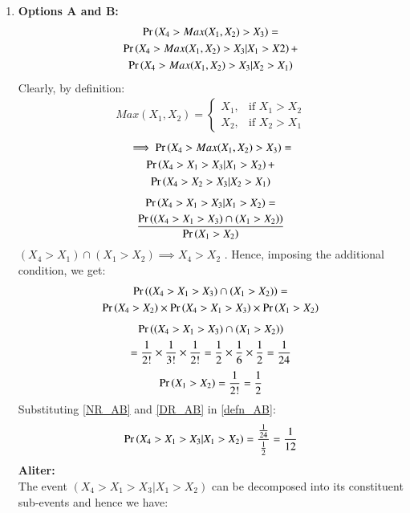 \documentclass[journal,12pt,twocolumn]{IEEEtran}
\begin{document}
\begin{enumerate}
    \item \textbf{Options A and B:}
\begin{multline}
    \Pr\left(X_4 > Max(X_1,X_2) > X_3\right) = \\\Pr\left(X_4 > Max(X_1,X_2) > X_3 | X_1>X2 \right) + \\ \Pr\left(X_4 > Max(X_1,X_2) > X_3 | X_2>X_1 \right)
\end{multline}
Clearly, by definition:
\begin{align}
  Max(X_1,X_2) = 
  \begin{cases}
      X_1, & \text{if } X_1>X_2\\
    X_2, & \text{if } X_2>X_1
  \end{cases}
\end{align}
\begin{multline}
    \implies \Pr\left(X_4 > Max(X_1,X_2) > X_3\right) = \\\Pr\left(X_4 > X_1 > X_3| X_1 > X_2 \right) + \\ \Pr\left(X_4 > X_2 > X_3| X_2 > X_1\right)
\end{multline}
\begin{multline}
    \Pr\left(X_4 > X_1 > X_3 | X_1 > X_2 \right) = \\ \frac{\Pr\left((X_4 > X_1 > X_3) \cap (X_1 > X_2) \right)}{\Pr\left(X_1>X_2\right)} \label{defn_AB}
\end{multline}
$(X_4>X_1) \cap (X_1>X_2) \implies X_4>X_2$ . Hence, imposing the additional condition, we get:
\begin{multline}
    \Pr\left((X_4 > X_1 > X_3) \cap (X_1 > X_2)\right) = \\\Pr\left(X_4>X_2\right) \times \Pr\left(X_4 > X_1 > X_3\right) \times \Pr\left(X_1 > X_2\right)
\end{multline}
\begin{multline}
 \Pr\left((X_4 > X_1 > X_3) \cap (X_1 > X_2)\right)\\
    = \frac{1}{2!}\times \frac{1}{3!}\times \frac{1}{2!}
    = \frac{1}{2}\times \frac{1}{6}\times \frac{1}{2}= \frac{1}{24} \label{NR_AB}
\end{multline}
\begin{align}
    \Pr\left(X_1>X_2\right) = \frac{1}{2!} = \frac{1}{2} \label{DR_AB}
\end{align}
Substituting \eqref{NR_AB} and \eqref{DR_AB} in \eqref{defn_AB}:
\begin{align}
    \Pr\left(X_4 > X_1 > X_3 | X_1 > X_2 \right) = \dfrac{\frac{1}{24}}{\frac{1}{2}} = \frac{1}{12}
\end{align}
\textbf{Aliter:}\\
The event $(X_4 > X_1 > X_3 | X_1 > X_2)$ can be decomposed into its constituent sub-events and hence we have:

\end{enumerate}
\end{document}
